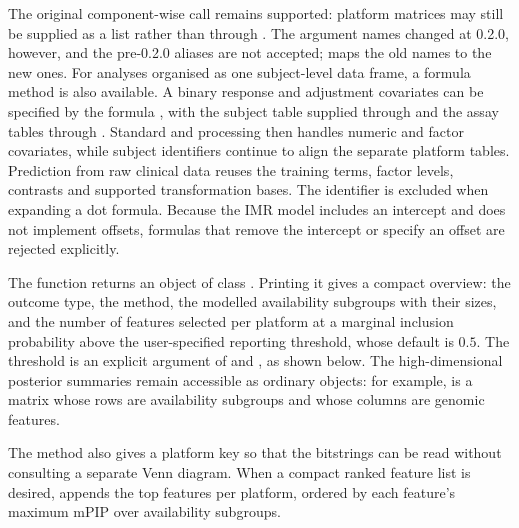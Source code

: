 \documentclass[article]{jss}
\begin{document}
The original component-wise call remains supported: platform matrices may
still be supplied as a list rather than through . The
argument names changed at 0.2.0, however, and the pre-0.2.0 aliases are not
accepted;  maps the old names to the new ones.
For analyses organised as one subject-level data frame, a formula method is
also available.  A binary response and adjustment covariates can be specified
by the formula , with the subject
table supplied through  and the assay tables through
. Standard  and
 processing then handles numeric and factor covariates,
while subject identifiers continue to align the separate platform tables.
Prediction from raw clinical data reuses the training terms, factor levels,
contrasts and supported transformation bases. The identifier is excluded when
expanding a dot formula. Because the IMR model includes an intercept and does
not implement offsets, formulas that remove the intercept or specify an offset
are rejected explicitly.

The function returns an object of class . Printing it gives a
compact overview: the outcome type, the method, the modelled availability
subgroups with their sizes, and the number of features selected per platform at
a marginal inclusion probability above the user-specified
reporting threshold, whose default is $0.5$.  The threshold is an explicit
argument of  and , as shown below.
The high-dimensional posterior summaries remain accessible as ordinary
 objects: for example,  is a matrix whose
rows are availability subgroups and whose columns are genomic features.

The  method also gives a platform key so that the bitstrings
can be read without consulting a separate Venn diagram.  When a compact ranked
feature list is desired,  appends the
top features per platform, ordered by each feature's maximum mPIP over
availability subgroups.
\end{document}
